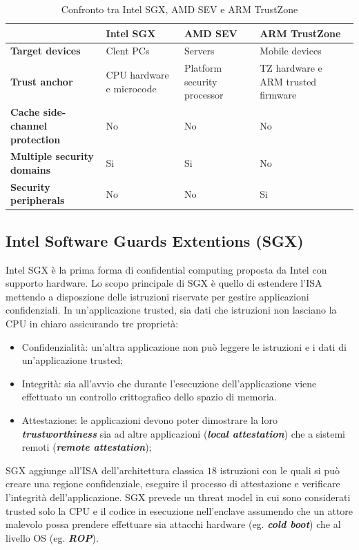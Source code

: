 \documentclass{article}
\begin{document}
\begin{table}
\centering
\begin{tabular}{|p{3cm}|p{3cm}|p{3cm}|p{3cm}|}
\hline
\textbf{} & \textbf{Intel SGX} & \textbf{AMD SEV} & \textbf{ARM TrustZone} \\ \hline
\textbf{Target devices} & Clent PCs & Servers & Mobile devices  \\ \hline
\textbf{Trust anchor} & CPU hardware e microcode & Platform security processor & TZ hardware e ARM trusted firmware \\ \hline
\textbf{Cache side-channel protection} & No  & No  & No \\ \hline
\textbf{Multiple security domains} & Si & Si & No \\ \hline
\textbf{Security peripherals} & No & No & Si \\ \hline
\end{tabular}
\caption{Confronto tra Intel SGX, AMD SEV e ARM TrustZone}
\label{tab:tee-implementations}
\end{table}

\subsection{Intel Software Guards Extentions (SGX)}
Intel SGX è la prima forma di confidential computing proposta da Intel con supporto hardware. Lo scopo principale di SGX è quello di estendere l'ISA mettendo a disposzione delle istruzioni riservate per gestire applicazioni confidenziali. In un'applicazione trusted, sia dati che istruzioni non lasciano la CPU in chiaro assicurando tre proprietà:
\begin{itemize}
  \item Confidenzialità: un'altra applicazione non può leggere le istruzioni e i dati di un'applicazione trusted;
  \item Integrità: sia all'avvio che durante l'esecuzione dell'applicazione viene effettuato un controllo crittografico dello spazio di memoria. 
  \item Attestazione: le applicazioni devono poter dimostrare la loro \textbf{\textit{trustworthiness}} sia ad altre applicazioni (\textbf{\textit{local attestation}}) che a sistemi remoti (\textbf{\textit{remote attestation}});
\end{itemize}

SGX aggiunge all'ISA dell'architettura classica $18$ istruzioni con le quali si può creare una regione confidenziale, eseguire il processo di attestazione e verificare l'integrità dell'applicazione. 
SGX prevede un threat model in cui sono considerati trusted solo la CPU e il codice in esecuzione nell'enclave assumendo che un attore malevolo possa prendere effettuare sia attacchi hardware (eg. \textbf{\textit{cold boot}}) che al livello OS (eg. \textbf{\textit{ROP}}).
\end{document}
